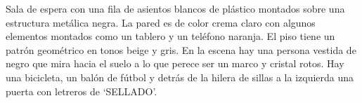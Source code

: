 Sala de espera con una fila de asientos blancos de plástico montados sobre una estructura metálica negra. La pared es de color crema claro con algunos elementos montados como un tablero y un teléfono naranja. El piso tiene un patrón geométrico en tonos beige y gris. En la escena hay una persona vestida de negro que mira hacia el suelo a lo que perece ser un marco y cristal rotos. Hay una bicicleta, un balón de fútbol y detrás de la hilera de sillas a la izquierda una puerta con letreros de `SELLADO'.












